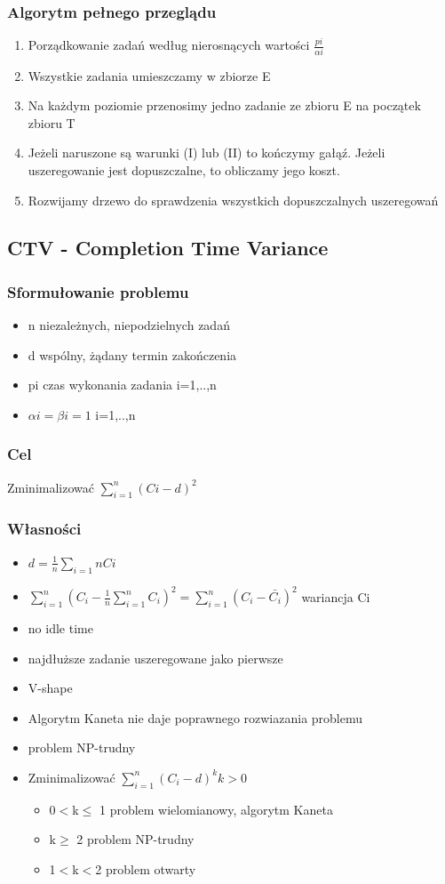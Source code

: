 \documentclass[12pt,a4paper]{article}
\begin{document}
\subsubsection{Algorytm pełnego przeglądu}
\begin{enumerate}
\item Porządkowanie zadań według nierosnących wartości $\frac{pi}{\alpha i}$
\item Wszystkie zadania umieszczamy w zbiorze E
\item Na każdym poziomie przenosimy jedno zadanie ze zbioru E na początek zbioru T
\item Jeżeli naruszone są warunki (I) lub (II) to kończymy gałąź. Jeżeli uszeregowanie jest dopuszczalne, to obliczamy jego koszt.
\item Rozwijamy drzewo do sprawdzenia wszystkich dopuszczalnych uszeregowań
\end{enumerate}
\subsection{CTV - Completion Time Variance}
\subsubsection{Sformułowanie problemu}
\begin{itemize}
\item n niezależnych, niepodzielnych zadań
\item d wspólny, żądany termin zakończenia
\item pi czas wykonania zadania i=1,..,n
\item $\alpha i = \beta i = 1$ i=1,..,n
\end{itemize}
\subsubsection{Cel}
Zminimalizować $\sum\limits_{i=1}^{n}(Ci-d)^2$
\subsubsection{Własności}
\begin{itemize}
\item $d=\frac{1}{n}\sum\limits_{i=1}{n}Ci$
\item $\sum\limits_{i=1}^{n}(C_{i}-\frac{1}{n}\sum\limits_{i=1}^{n}C_{i})^2 = \sum\limits_{i=1}^{n}(C_{i}- \bar{C_{i}})^2$ wariancja Ci
\item no idle time
\item najdłuższe zadanie uszeregowane jako pierwsze
\item V-shape
\item Algorytm Kaneta nie daje poprawnego rozwiazania problemu
\item problem NP-trudny
\item Zminimalizować $\sum\limits_{i=1}^{n}(C_{i}-d)^k k>0$
\begin{itemize}
\item 0$<$k$\leq$ 1 problem wielomianowy, algorytm Kaneta
\item k$\geq$ 2 problem NP-trudny
\item 1$<$k$<$2 problem otwarty
\end{itemize}
\end{itemize}
\end{document}

